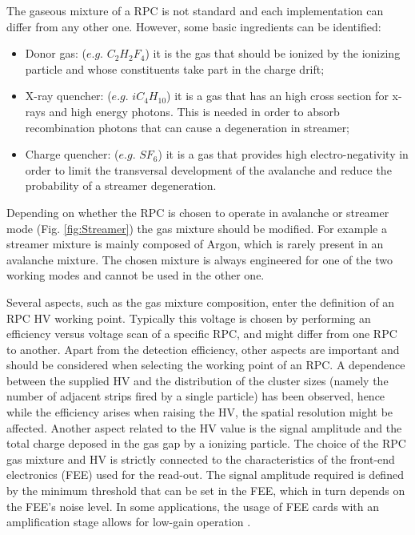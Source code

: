 The gaseous mixture of a RPC is not standard and each implementation can differ from any other one.
However, some basic ingredients can be identified:
\begin{itemize}
\item Donor gas: ($e.g.$ $C_2H_2F_4$) it is the gas that should be ionized by the ionizing particle and whose constituents take part in the charge drift;
\item X-ray quencher: ($e.g.$ $iC_4H_{10}$) it is a gas that has an high cross section for x-rays and high energy photons. This is needed in order to absorb recombination photons that can cause a degeneration in streamer;
\item Charge quencher: ($e.g.$ $SF_6$) it is a gas that provides high electro-negativity in order to limit the transversal development of the avalanche and reduce the probability of a streamer degeneration.
\end{itemize}

Depending on whether the RPC is chosen to operate in avalanche or streamer mode (Fig. \ref{fig:Streamer}) the gas mixture should be modified.
For example a streamer mixture is mainly composed of Argon, which is rarely present in an avalanche mixture.
The chosen mixture is always engineered for one of the two working modes and cannot be used in the other one.

Several aspects, such as the gas mixture composition, enter the definition of an RPC HV working point.
Typically this voltage is chosen by performing an efficiency versus voltage scan of a specific RPC, and might differ from one RPC to another.
Apart from the detection efficiency, other aspects are important and should be considered when selecting the working point of an RPC.
A dependence between the supplied HV and the distribution of the cluster sizes (namely the number of adjacent strips fired by a single particle) has been observed, hence while the efficiency arises when raising the HV, the spatial resolution might be affected.
Another aspect related to the HV value is the signal amplitude and the total charge deposed in the gas gap by a ionizing particle.
The choice  of the RPC gas mixture and HV is strictly connected to the characteristics of the front-end electronics (FEE) used for the read-out. 
The signal amplitude required is defined by the minimum threshold that can be set in the FEE, which in turn depends on the FEE’s noise level. 
In some applications, the usage of FEE cards with an amplification stage allows for low-gain operation \cite{Marchisone:2017bcb}.

